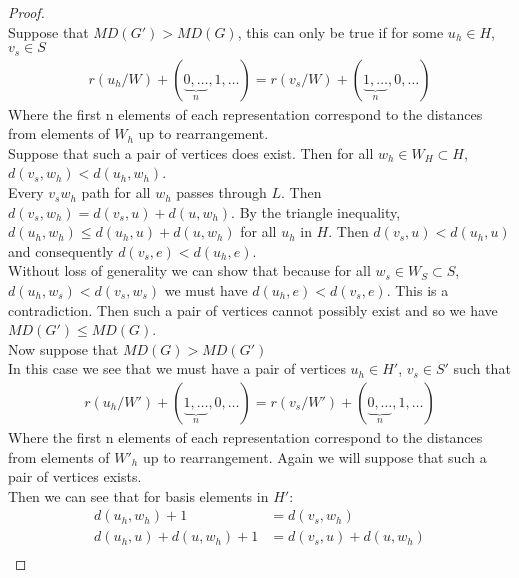 \documentclass[11pt]{amsart}
\theoremstyle{plain}  %
\theoremstyle{definition}
\theoremstyle{remark}
\numberwithin{equation}{thm}
\begin{document}
\begin{proof}$\ $\\
 Suppose that $MD(G') > MD(G)$, this can only be true if for some $u_h \in H$, $v_s\in S$
\begin{align*}
 r(u_h/W) + (\underbrace{0,\dots}_{n},1,\dots) = r(v_s/W) + (\underbrace{1,\dots}_{n},0,\dots)
\end{align*}
Where the first n elements of each representation correspond to the distances from elements of $W_h$ up to rearrangement.\\
Suppose that such a pair of vertices does exist. Then for all $w_h\in W_H \subset H$,\\ $d(v_s, w_h)<d(u_h, w_h)$.\\
Every $v_sw_h$ path for all $w_h$ passes through $L$. Then $d(v_s, w_h)=d(v_s, u)+ d(u, w_h)$. 
By the triangle inequality, $d(u_h, w_h) \leq d(u_h, u) + d(u, w_h)$ for all $u_h$ in $H$.
Then $d(v_s, u)<d(u_h,u)$ and consequently $d(v_s, e)<d(u_h, e)$.\\
Without loss of generality we can show that because for all $w_s\in W_S\subset S$, $d(u_h, w_s)<d(v_s, w_s)$ we must have
$d(u_h, e)<d(v_s,e)$. This is a contradiction. Then such a pair of vertices cannot possibly exist and so we have $MD(G') \leq MD(G)$.\\
Now suppose that $MD(G) > MD(G')$\\
In this case we see that we must have a pair of vertices $u_h \in H'$, $v_s\in S'$ such that
\begin{align*}
 r(u_h/W') + (\underbrace{1,\dots}_{n},0,\dots) = r(v_s/W') + (\underbrace{0,\dots}_{n},1,\dots)
\end{align*}
Where the first n elements of each representation correspond to the distances from elements of $W'_h$ up to rearrangement. 
Again we will suppose that such a pair of vertices exists.\\ 
Then we can see that for basis elements in $H'$:
\begin{align*}
d(u_h, w_h) + 1 &= d(v_s,w_h)\\
d(u_h, u) + d(u, w_h) + 1 &= d(v_s, u) + d(u, w_h)\\

\end{align*}
\end{proof}
\end{document}
